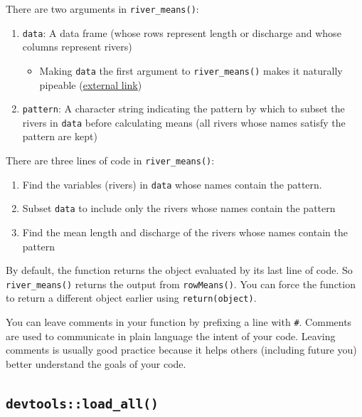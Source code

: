 \documentclass[
]{book}
\providecommand{\tightlist}{%
  \setlength{\itemsep}{0pt}\setlength{\parskip}{0pt}}
\begin{document}
There are two arguments in \texttt{river\_means()}:

\begin{enumerate}
\def\labelenumi{\arabic{enumi}.}
\tightlist
\item
  \texttt{data}: A data frame (whose rows represent length or discharge and whose columns represent rivers)

  \begin{itemize}
  \tightlist
  \item
    Making \texttt{data} the first argument to \texttt{river\_means()} makes it naturally pipeable (\href{https://r4ds.had.co.nz/pipes.html}{external link})
  \end{itemize}
\item
  \texttt{pattern}: A character string indicating the pattern by which to subset the rivers in \texttt{data} before calculating means (all rivers whose names satisfy the pattern are kept)
\end{enumerate}

There are three lines of code in \texttt{river\_means()}:

\begin{enumerate}
\def\labelenumi{\arabic{enumi}.}
\tightlist
\item
  Find the variables (rivers) in \texttt{data} whose names contain the pattern.
\item
  Subset \texttt{data} to include only the rivers whose names contain the pattern
\item
  Find the mean length and discharge of the rivers whose names contain the pattern
\end{enumerate}

By default, the function returns the object evaluated by its last line of code. So \texttt{river\_means()} returns the output from \texttt{rowMeans()}. You can force the function to return a different object earlier using \texttt{return(object)}.

You can leave comments in your function by prefixing a line with \texttt{\#}. Comments are used to communicate in plain language the intent of your code. Leaving comments is usually good practice because it helps others (including future you) better understand the goals of your code.

\hypertarget{load-all}{%
\subsection{\texorpdfstring{\texttt{devtools::load\_all()}}{devtools::load\_all()}}\label{load-all}}
\end{document}
